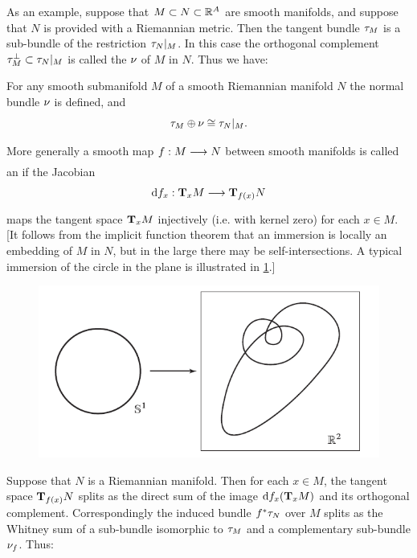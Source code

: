 \documentclass[../main]{subfiles}
\begin{document}
As an example, suppose that $M\subset N\subset \bR^A$ are smooth manifolds, and suppose that $N$ is provided with a Riemannian metric. Then the tangent bundle $\tangentbundle{M}$ is a sub-bundle of the restriction $\tangentbundle{N}|_M$. In this case the orthogonal complement $\tangentbundle{M}^\perp \subset\tangentbundle{N}|_M$ is called the  $\normalbundle{}$ of $M$
in $N$. Thus we have:


\begin{corollary} \label{cor:03.04} 
For any smooth submanifold $M$ of a smooth Riemannian manifold $N$ the normal bundle $\normalbundle{}$ is defined, and
\[
\tangentbundle{M}\oplus\nu \cong \tangentbundle{N}|_M.
\]
\end{corollary}


More generally a smooth map $f : M \varrightarrow{} N$ between smooth manifolds is called an  if the Jacobian
\[
\differential{f}{x} : \tangentspace{M}{x} \varrightarrow{} \tangentspace{N}{f(x)}
\]
maps the tangent space $\tangentspace{M}{x}$ injectively (i.e. with kernel zero) for each $x \in M$. [It follows from the implicit function theorem that an immersion is locally an embedding of $M$ in $N$, but in the large there may be self-intersections. A typical immersion of the circle in the plane is illustrated in \ref{fig:figure4}.]

\begin{figure}[ht]
    \centering
    \includegraphics[scale=0.5]{"../tex from old group/fig4.png"}
    \caption{}
    \label{fig:figure4}
\end{figure}

Suppose that $N$ is a Riemannian manifold. Then for each $x\in M$, the
tangent space $\tangentspace{N}{f(x)}$ splits as the direct sum of the image $\differential{f}{x}(\tangentspace{M}{x})$ and its orthogonal complement. Correspondingly the induced bundle $f^* \tangentbundle{N}$ over $M$ splits as the Whitney sum of a sub-bundle isomorphic to $\tangentbundle{M}$ and a complementary sub-bundle $\normalbundle{f}$. Thus:
\end{document}
